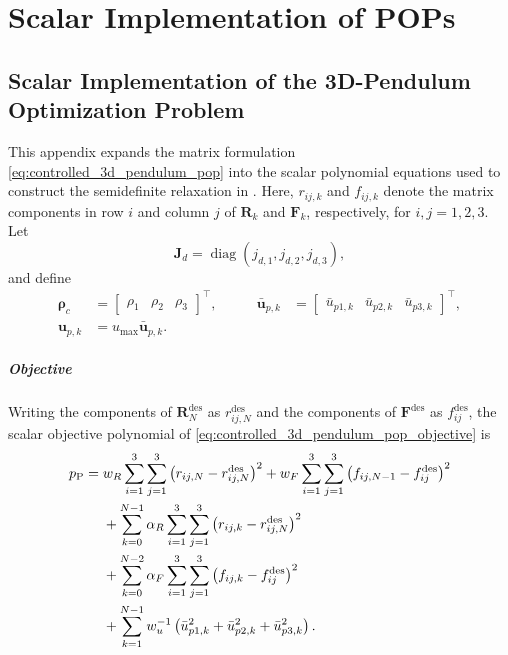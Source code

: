 \chapter{Scalar Implementation of POPs}
\section{Scalar Implementation of the 3D-Pendulum Optimization Problem}
\label{app:controlled_3d_pendulum_scalar_pop}

This appendix expands the matrix formulation
\eqref{eq:controlled_3d_pendulum_pop} into the scalar polynomial equations used
to construct the semidefinite relaxation in \cite{Elshani2026CTO_GitHub}. Here,
\(r_{ij,k}\) and \(f_{ij,k}\) denote the matrix components in row \(i\) and
column \(j\) of \(\bm{R}_k\) and \(\bm{F}_k\), respectively, for \(i,j=1,2,3\). Let
\begin{equation}
\bm{J}_d=\operatorname{diag}(j_{d,1},j_{d,2},j_{d,3}),
\label{eq:app_3d_scalar_matrices}
\end{equation}
and define
\begin{equation}
\begin{aligned}
\bm{\rho}_c
&=\begin{bmatrix}\rho_1&\rho_2&\rho_3\end{bmatrix}^{\top},
&\qquad
\bar{\bm{u}}_{p,k}
&=\begin{bmatrix}\bar u_{p1,k}&\bar u_{p2,k}&\bar u_{p3,k}\end{bmatrix}^{\top},
\\
\bm{u}_{p,k}
&=u_{\max}\bar{\bm{u}}_{p,k}.
\end{aligned}
\label{eq:app_3d_scalar_vectors}
\end{equation}

\paragraph{Objective}

Writing the components of \(\bm{R}_N^{\mathrm{des}}\) as
\(r_{ij,N}^{\mathrm{des}}\) and the components of
\(\bm{F}^{\mathrm{des}}\) as \(f_{ij}^{\mathrm{des}}\), the scalar objective polynomial of \eqref{eq:controlled_3d_pendulum_pop_objective} is
\begin{align}
p_{\mathrm P}
=\;&
w_R\sum_{i=1}^{3}\sum_{j=1}^{3}
\left(r_{ij,N}-r_{ij,N}^{\mathrm{des}}\right)^2
+w_F\sum_{i=1}^{3}\sum_{j=1}^{3}
\left(f_{ij,N-1}-f_{ij}^{\mathrm{des}}\right)^2
\notag\\
&+\sum_{k=0}^{N-1}\alpha_R
\sum_{i=1}^{3}\sum_{j=1}^{3}
\left(r_{ij,k}-r_{ij,N}^{\mathrm{des}}\right)^2
\notag\\
&+\sum_{k=0}^{N-2}\alpha_F
\sum_{i=1}^{3}\sum_{j=1}^{3}
\left(f_{ij,k}-f_{ij}^{\mathrm{des}}\right)^2
\notag\\
&+\sum_{k=1}^{N-1}w_u^{-1}
\left(\bar u_{p1,k}^2+\bar u_{p2,k}^2+\bar u_{p3,k}^2\right).
\label{eq:app_3d_scalar_objective}
\end{align}

